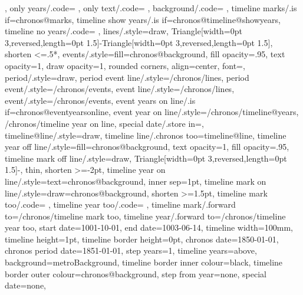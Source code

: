{{{    }%
  },
  only years/.code={%
  },
  only text/.code={%
    \tikzset{/chronos/only years}%
    \chronossetdateformat{}%
  },
  background/.code={%
  },
  timeline marks/.is if=chronos@marks,
  timeline show years/.is if=chronos@timeline@showyears,
  timeline no years/.code={%
    \tikzset{%
      /chronos/timeline show years=false,
    }%
  },
  lines/.style={draw, {Triangle[width=0pt 3,reversed,length=0pt 1.5]}-{Triangle[width=0pt 3,reversed,length=0pt 1.5]}, shorten <={.5*\chronos@height}},
  events/.style={fill=chronos@background, fill opacity=.95, text opacity=1, draw opacity=1, rounded corners, align=center, font=\footnotesize},
  period/.style={draw},
  period event line/.style={/chronos/lines},
  period event/.style={/chronos/events},
  event line/.style={/chronos/lines},
  event/.style={/chronos/events},
  event years on line/.is if=chronos@eventyearsonline,
  event year on line/.style={/chronos/timeline@years, /chronos/timeline year on line},
  special date/.store in=\chronos@specialdate,
  timeline@line/.style={draw},
  timeline line/.chronos too=timeline@line,
  timeline year off line/.style={fill=chronos@background, text opacity=1, fill opacity=.95},
  timeline mark off line/.style={draw, {Triangle[width=0pt 3,reversed,length=0pt 1.5]}-, thin, shorten >=-2pt},
  timeline year on line/.style={text=chronos@background, inner sep=1pt},
  timeline mark on line/.style={draw=chronos@background, shorten >=1.5pt},
  timeline mark too/.code={%
  },
  timeline year too/.code={%
  },
  timeline mark/.forward to=/chronos/timeline mark too,
  timeline year/.forward to=/chronos/timeline year too,
  start date=1001-10-01,
  end date=1003-06-14,
  timeline width=100mm,
  timeline height=1pt,
  timeline border height=0pt,
  chronos date=1850-01-01,
  chronos period date=1851-01-01,
  step years=1,
  timeline years=above,
  background=metroBackground,
  timeline border inner colour=black,
  timeline border outer colour=chronos@background,
  step from year=none,
  special date=none,
}
